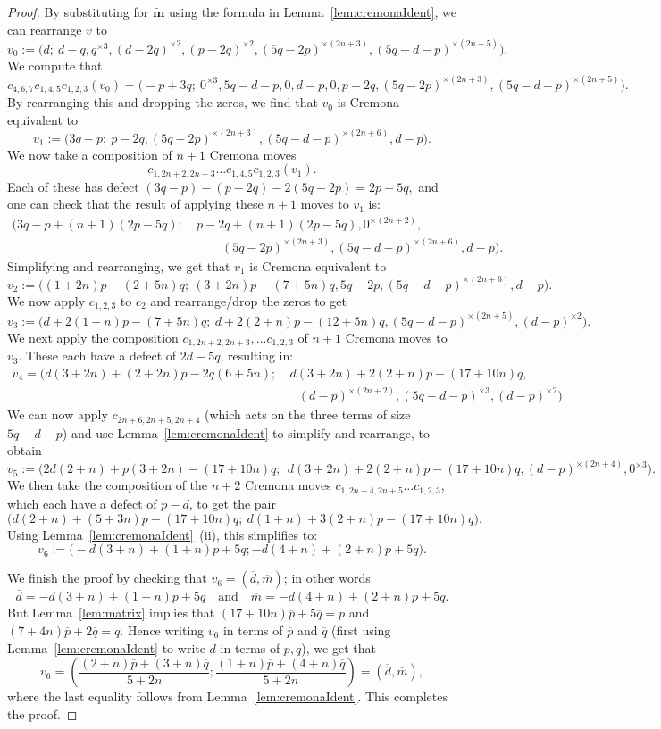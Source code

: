 \documentclass[11pt, reqno]{amsart}
\theoremstyle{remark}
\numberwithin{equation}{subsection}
\numberwithin{figure}{section}
\theoremstyle{customremark}
\newcommand{\ov}{\overline}
\newcommand{\btm}{\widetilde{\bm{m}}}
\begin{document}
\begin{proof}
By substituting for $\btm$ using the formula in  Lemma~\ref{lem:cremonaIdent}, we can rearrange $v$  to
\[ v_0:=\bigl(d;\ d-q,q^{\times 3},(d-2q)^{\times 2},(p-2q)^{\times 2},(5q-2p)^{\times (2n+3)},(5q-d-p)^{\times (2n+5)}\bigr).\]
We compute that 
\[ c_{4,6,7}c_{1,4,5}c_{1,2,3}(v_0)=\bigl(-p+3q;\ 0^{\times 3},5q-d-p,0,d-p,0,p-2q,(5q-2p)^{\times (2n+3)},(5q-d-p)^{\times (2n+5)}\bigr).\]
By rearranging this and dropping the zeros, we find that $v_0$ is Cremona equivalent to
\[ v_1:=\bigl(3q-p;\ p-2q,(5q-2p)^{\times (2n+3)},(5q-d-p)^{\times (2n+6)},d-p\bigr).\]
We now take a composition of $n+1$ Cremona moves 
\[c_{1,2n+2,2n+3} \hdots c_{1,4,5}c_{1,2,3}(v_1).\]
Each of these has defect $(3q-p)-(p-2q)-2(5q-2p)=2p-5q,$ and one can check that  the result of applying these $n+1$ moves to $v_1$ is:
\begin{align*} \bigl(3q-p+(n+1)(2p-5q);\ &p-2q+(n+1)(2p-5q), 0^{\times (2n+2)},\\ &\qquad (5q-2p)^{\times (2n+3)},(5q-d-p)^{\times (2n+6)},d-p\bigr).\end{align*}
Simplifying and rearranging, we get that $v_1$ is Cremona equivalent to
\[v_2:=\bigl((1+2n)p-(2+5n)q;\ (3+2n)p-(7+5n)q,5q-2p,(5q-d-p)^{\times (2n+6)},d-p\bigr).\]
We now apply $c_{1,2,3}$ to $c_2$ and rearrange/drop the zeros to get
\[ v_3:=\bigl(d+2(1+n)p-(7+5n)q;\ d+2(2+n)p-(12+5n)q,(5q-d-p)^{\times (2n+5)},(d-p)^{\times 2}\bigr).\]
We next apply the composition $c_{1,2n+2,2n+3},\hdots c_{1,2,3}$ of $n+1$ Cremona moves to $v_3$. These  each have a defect of $2d-5q$, resulting in: 
\begin{align*}v_4 = \bigl(d(3+2n)+(2+2n)p-2q(6+5n);\ & d(3+2n)+2(2+n)p-(17+10n)q, \\ 
&\ \  \ (d-p)^{\times (2n+2)},(5q-d-p)^{\times 3},(d-p)^{\times 2}\bigr)\end{align*}
We can now apply $c_{2n+6,2n+5,2n+4}$ (which acts on the three terms of size $5q-d-p$) and use Lemma~\ref{lem:cremonaIdent} to simplify and rearrange, to obtain   %
\[ v_5:=\bigl(2d(2+n)+p(3+2n)-(17+10n)q;\ \
d(3+2n)+2(2+n)p-(17+10n)q, 
(d-p)^{\times (2n+4)},0^{\times 3}\bigr).
\]
We then take the composition of the $n+2$ Cremona moves $c_{1,2n+4,2n+5}\hdots c_{1,2,3}$, which  each have a defect of $p-d$, 
to get the pair
\[ \bigl(d(2+n)+(5+3n)p-(17+10n)q;\  d(1+n)+3(2+n)p-(17+10n)q\bigr).\]
Using Lemma~\ref{lem:cremonaIdent}~(ii), this simplifies to:
\[ v_6:=\bigr(-d(3+n)+(1+n)p+5q; -d(4+n)+(2+n)p+5q\bigl).\]

We finish the proof by checking that $v_6 = (\ov{d}, \ov{m})$; in other words
\[ \ov{d}=-d(3+n)+(1+n)p+5q \quad \text{and} \quad \ov{m}=-d(4+n)+(2+n)p+5q.\]
But Lemma~\ref{lem:matrix} implies that
$(17+10n)\ov{p}+5\ov{q}=p$ and $(7+4n)\ov{p}+2\ov{q}=q.$ Hence writing $v_6$ in terms of $\ov{p}$ and $\ov{q}$ (first using Lemma~\ref{lem:cremonaIdent} to write $d$ in terms of $p,q$), we get that 
\[ v_6=\left(\frac{(2+n)\ov{p}+(3+n)\ov{q}}{5+2n};\frac{(1+n)\ov{p}+(4+n)\ov{q}}{5+2n}\right)=(\ov{d},\ov{m}),\]
where the last equality follows from Lemma~\ref{lem:cremonaIdent}. This completes the proof.
\end{proof}
\end{document}
